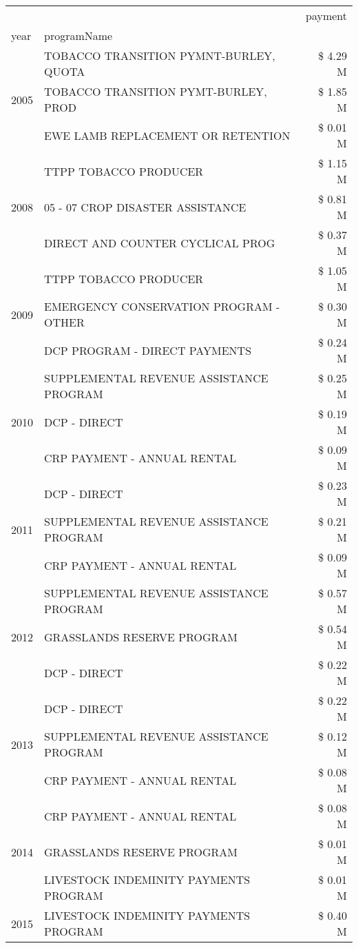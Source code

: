 \begin{tabular}{llr}
\toprule
 &  & payment \\
year & programName &  \\
\midrule
\multirow[t]{3}{*}{2005} & TOBACCO TRANSITION PYMNT-BURLEY, QUOTA & \$ 4.29 M \\
 & TOBACCO TRANSITION PYMT-BURLEY, PROD & \$ 1.85 M \\
 & EWE LAMB REPLACEMENT OR RETENTION & \$ 0.01 M \\
\cline{1-3}
\multirow[t]{3}{*}{2008} & TTPP TOBACCO PRODUCER & \$ 1.15 M \\
 & 05 - 07 CROP DISASTER ASSISTANCE & \$ 0.81 M \\
 & DIRECT AND COUNTER CYCLICAL PROG & \$ 0.37 M \\
\cline{1-3}
\multirow[t]{3}{*}{2009} & TTPP TOBACCO PRODUCER & \$ 1.05 M \\
 & EMERGENCY CONSERVATION PROGRAM - OTHER & \$ 0.30 M \\
 & DCP PROGRAM - DIRECT PAYMENTS & \$ 0.24 M \\
\cline{1-3}
\multirow[t]{3}{*}{2010} & SUPPLEMENTAL REVENUE ASSISTANCE PROGRAM & \$ 0.25 M \\
 & DCP - DIRECT & \$ 0.19 M \\
 & CRP PAYMENT - ANNUAL RENTAL & \$ 0.09 M \\
\cline{1-3}
\multirow[t]{3}{*}{2011} & DCP - DIRECT & \$ 0.23 M \\
 & SUPPLEMENTAL REVENUE ASSISTANCE PROGRAM & \$ 0.21 M \\
 & CRP PAYMENT - ANNUAL RENTAL & \$ 0.09 M \\
\cline{1-3}
\multirow[t]{3}{*}{2012} & SUPPLEMENTAL REVENUE ASSISTANCE PROGRAM & \$ 0.57 M \\
 & GRASSLANDS RESERVE PROGRAM & \$ 0.54 M \\
 & DCP - DIRECT & \$ 0.22 M \\
\cline{1-3}
\multirow[t]{3}{*}{2013} & DCP - DIRECT & \$ 0.22 M \\
 & SUPPLEMENTAL REVENUE ASSISTANCE PROGRAM & \$ 0.12 M \\
 & CRP PAYMENT - ANNUAL RENTAL & \$ 0.08 M \\
\cline{1-3}
\multirow[t]{3}{*}{2014} & CRP PAYMENT - ANNUAL RENTAL & \$ 0.08 M \\
 & GRASSLANDS RESERVE PROGRAM & \$ 0.01 M \\
 & LIVESTOCK INDEMINITY PAYMENTS PROGRAM & \$ 0.01 M \\
\cline{1-3}
\multirow[t]{3}{*}{2015} & LIVESTOCK INDEMINITY PAYMENTS PROGRAM & \$ 0.40 M \\

\end{tabular}
